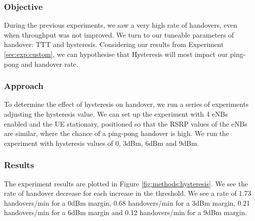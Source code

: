 \subsubsection{Objective}
During the previous experiments, we saw a very high rate of handovers, even when throughput was not improved. We turn to our tuneable parameters of handover: TTT and hysteresis. Considering our results from Experiment \ref{sec:exp:custom}, we can hypothesise that Hysteresis will most impact our ping-pong and handover rate.

\subsubsection{Approach}
To determine the effect of hysteresis on handover, we run a series of experiments adjusting the hysteresis value. We can set up the experiment with 4 eNBs enabled and the UE stationary, positioned so that the RSRP values of the eNBs are similar, where the chance of a ping-pong handover is high. We run the experiment with hysteresis values of 0, 3dBm, 6dBm and 9dBm.

\subsubsection{Results}
The experiment results are plotted in Figure \ref{fig:methods:hysteresis}. We see the rate of handover decrease for each increase in the threshold. We see a rate of 1.73 handovers/min for a 0dBm margin, 0.68 handovers/min for a 3dBm margin,  0.21 handovers/min for a 6dBm margin and 0.12 handovers/min for a 9dBm margin.

